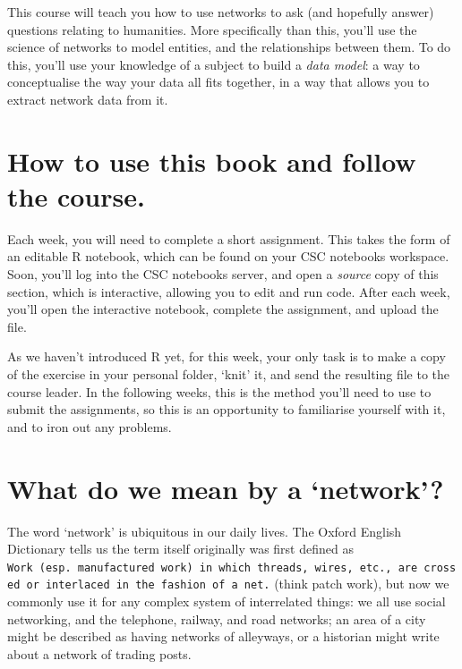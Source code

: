 \documentclass[
]{book}
\begin{document}
This course will teach you how to use networks to ask (and hopefully answer) questions relating to humanities. More specifically than this, you'll use the science of networks to model entities, and the relationships between them. To do this, you'll use your knowledge of a subject to build a \emph{data model}: a way to conceptualise the way your data all fits together, in a way that allows you to extract network data from it.

\hypertarget{how-to-use-this-book-and-follow-the-course.}{%
\section{How to use this book and follow the course.}\label{how-to-use-this-book-and-follow-the-course.}}

Each week, you will need to complete a short assignment. This takes the form of an editable R notebook, which can be found on your CSC notebooks workspace. Soon, you'll log into the CSC notebooks server, and open a \emph{source} copy of this section, which is interactive, allowing you to edit and run code. After each week, you'll open the interactive notebook, complete the assignment, and upload the file.

As we haven't introduced R yet, for this week, your only task is to make a copy of the exercise in your personal folder, `knit' it, and send the resulting file to the course leader. In the following weeks, this is the method you'll need to use to submit the assignments, so this is an opportunity to familiarise yourself with it, and to iron out any problems.

\hypertarget{what-do-we-mean-by-a-network}{%
\section{What do we mean by a `network'?}\label{what-do-we-mean-by-a-network}}

The word `network' is ubiquitous in our daily lives. The Oxford English Dictionary tells us the term itself originally was first defined as \texttt{Work\ (esp.\ manufactured\ work)\ in\ which\ threads,\ wires,\ etc.,\ are\ crossed\ or\ interlaced\ in\ the\ fashion\ of\ a\ net.} (think patch work), but now we commonly use it for any complex system of interrelated things: we all use social networking, and the telephone, railway, and road networks; an area of a city might be described as having networks of alleyways, or a historian might write about a network of trading posts.
\end{document}
